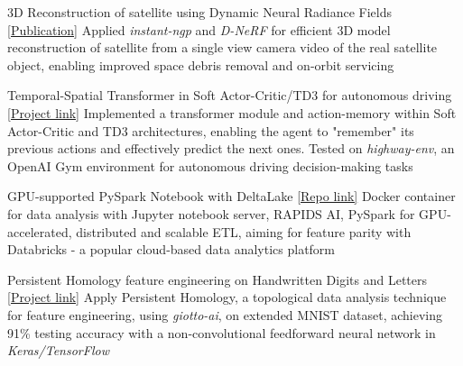 
\begin{cventries}

	\cventry
	{}
	{3D Reconstruction of satellite using Dynamic Neural Radiance Fields}
	{\href{https://arxiv.org/abs/2301.09060}{[Publication]}}
	{}
	{Applied \emph{instant-ngp} and \emph{D-NeRF} for efficient 3D model reconstruction of satellite from a single view camera video of the real satellite object, enabling improved space debris removal and on-orbit servicing}

	\cventry
	{}
	{Temporal-Spatial Transformer in Soft Actor-Critic/TD3 for autonomous driving}
	{\href{https://github.com/sesem738/Lavenza}{[Project link]}}
	{}
	{Implemented a transformer module and action-memory within Soft Actor-Critic and TD3 architectures, enabling the agent to "remember" its previous actions and effectively predict the next ones. Tested on \emph{highway-env}, an OpenAI Gym environment for autonomous driving decision-making tasks}

	\cventry
	{}
	{GPU-supported PySpark Notebook with DeltaLake}
	{\href{https://github.com/n0k0m3/pyspark-notebook-deltalake-docker}{[Repo link]}}
	{}
	{Docker container for data analysis with Jupyter notebook server, RAPIDS AI, PySpark for GPU-accelerated, distributed and scalable ETL, aiming for feature parity with Databricks - a popular cloud-based data analytics platform}

	\cventry
	{}
	{Persistent Homology feature engineering on Handwritten Digits and Letters}
	{\href{https://colab.research.google.com/drive/18z161k3diYO6sNVBfiKH8uGqbrekxMPN?usp=sharing}{[Project link]}}
	{}
	{Apply Persistent Homology, a topological data analysis technique for feature engineering, using \emph{giotto-ai}, on extended MNIST dataset, achieving 91\% testing accuracy with a non-convolutional feedforward neural network in \emph{Keras/TensorFlow}}





\end{cventries}
